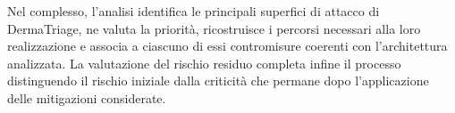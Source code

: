Nel complesso, l'analisi identifica le principali superfici di attacco di DermaTriage, ne valuta la priorità, ricostruisce i percorsi necessari alla loro realizzazione e associa a ciascuno di essi contromisure coerenti con l'architettura analizzata. La valutazione del rischio residuo completa infine il processo distinguendo il rischio iniziale dalla criticità che permane dopo l'applicazione delle mitigazioni considerate.